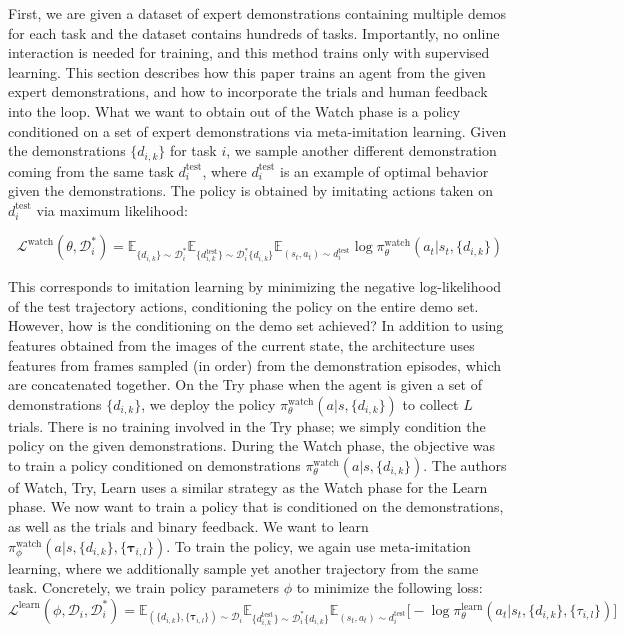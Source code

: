\documentclass[
  letterpaper,
  numbers=noenddot,
  DIV=11]{scrreprt}
\theoremstyle{plain}
\theoremstyle{definition}
\theoremstyle{plain}
\theoremstyle{remark}
\begin{document}
First, we are given a dataset of expert demonstrations containing
multiple demos for each task and the dataset contains hundreds of tasks.
Importantly, no online interaction is needed for training, and this
method trains only with supervised learning. This section describes how
this paper trains an agent from the given expert demonstrations, and how
to incorporate the trials and human feedback into the loop. What we want
to obtain out of the Watch phase is a policy conditioned on a set of
expert demonstrations via meta-imitation learning. Given the
demonstrations \(\{d_{i,k}\}\) for task \(i\), we sample another
different demonstration coming from the same task \(d_i^{\text{test}}\),
where \(d_i^{\text{test}}\) is an example of optimal behavior given the
demonstrations. The policy is obtained by imitating actions taken on
\(d_i^{\text{test}}\) via maximum likelihood:

\[\mathcal{L}^\text{watch}(\theta, \mathcal{D}_i^*) = \mathbb{E}_{\{d_{i,k}\} \sim \mathcal{D}_i^*} \mathbb{E}_{\{d_{i,k}^{\text{test}}\} \sim \mathcal{D}_i^*  \{d_{i,k}\}} \mathbb{E}_{(s_t, a_t) \sim d_i^{\text{test}}} \log \pi_\theta^{\text{watch}} (a_t | s_t, \{d_{i,k}\})\]

This corresponds to imitation learning by minimizing the negative
log-likelihood of the test trajectory actions, conditioning the policy
on the entire demo set. However, how is the conditioning on the demo set
achieved? In addition to using features obtained from the images of the
current state, the architecture uses features from frames sampled (in
order) from the demonstration episodes, which are concatenated together.
On the Try phase when the agent is given a set of demonstrations
\(\{d_{i,k}\}\), we deploy the policy
\(\pi_\theta^{\text{watch}}(a | s, \{d_{i,k}\})\) to collect \(L\)
trials. There is no training involved in the Try phase; we simply
condition the policy on the given demonstrations. During the Watch
phase, the objective was to train a policy conditioned on demonstrations
\(\pi_\theta^{\text{watch}}(a | s, \{d_{i,k}\})\). The authors of Watch,
Try, Learn uses a similar strategy as the Watch phase for the Learn
phase. We now want to train a policy that is conditioned on the
demonstrations, as well as the trials and binary feedback. We want to
learn
\(\pi_\phi^{\text{watch}}(a | s, \{d_{i,k}\}, \{\mathbf{\tau}_{i, l}\})\).
To train the policy, we again use meta-imitation learning, where we
additionally sample yet another trajectory from the same task.
Concretely, we train policy parameters \(\phi\) to minimize the
following loss:
\[\mathcal{L}^{\text{learn}}(\phi, \mathcal{D}_i, \mathcal{D}_i^*) = \mathbb{E}_{(\{d_{i,k}\}, \{\mathbf{\tau}_{i,l}\}) \sim \mathcal{D}_i} \mathbb{E}_{\{d_{i,k}^{\text{test}}\} \sim \mathcal{D}_i^* \{d_{i,k}\}} \mathbb{E}_{(s_t, a_t) \sim d_i^{\text{test}}} \big[- \log \pi_\theta^{\text{learn}} (a_t | s_t, \{d_{i,k}\}, \{\tau_{i,l}\}) \big]\]
\end{document}
